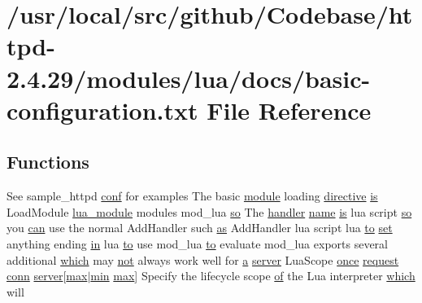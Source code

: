 \hypertarget{basic-configuration_8txt}{}\section{/usr/local/src/github/\+Codebase/httpd-\/2.4.29/modules/lua/docs/basic-\/configuration.txt File Reference}
\label{basic-configuration_8txt}
\subsection*{Functions}
\begin{DoxyCompactItemize}
\item 
See sample\+\_\+httpd \hyperlink{group__MOD__PROXY_ga4d7edd451c4bb8ed9ce9012e5dea2b14}{conf} for examples The basic \hyperlink{group__APACHE__CORE__CONFIG_ga0ea4f633a5f9f88e1603aaeb1f2b2e69}{module} loading \hyperlink{basic-configuration_8txt_afff511b23780162b3e88a118ec5cb4c9}{directive} \hyperlink{NON-AUTOTOOLS-BUILD_8txt_a2569119f3fd3f0d7d7ecea3c96acb0bf}{is} Load\+Module \hyperlink{mod__lua_8h_a572c149d43098558899328ff65c61394}{lua\+\_\+module} modules mod\+\_\+lua \hyperlink{pcretest_8txt_a35e1c9bd1e24f3f31253ab761f792055}{so} The \hyperlink{writing-handlers_8txt_a06375414bd03dc9c48eab0f361ada458}{handler} \hyperlink{pcre_8txt_a5a15d68aadb41c771fe50a27c400d49b}{name} \hyperlink{NON-AUTOTOOLS-BUILD_8txt_a2569119f3fd3f0d7d7ecea3c96acb0bf}{is} lua script \hyperlink{pcretest_8txt_a35e1c9bd1e24f3f31253ab761f792055}{so} you \hyperlink{pcre_8txt_a2a892895a50bc58f3679c7acb58190e6}{can} use the normal Add\+Handler such \hyperlink{pcretest_8txt_a7681723cb91eaa99771ee87f8465c1aa}{as} Add\+Handler lua script lua \hyperlink{pcretest_8txt_aa22c98f630e4b3fe86ee17ce5150c62f}{to} \hyperlink{README_8txt_af5b772536a61c888f9b40122c9816047}{set} anything ending \hyperlink{group__apr__thread__proc_ga2e46fea00cc2238744ebca5061c62bcc}{in} lua \hyperlink{pcretest_8txt_aa22c98f630e4b3fe86ee17ce5150c62f}{to} use mod\+\_\+lua \hyperlink{pcretest_8txt_aa22c98f630e4b3fe86ee17ce5150c62f}{to} evaluate mod\+\_\+lua exports several additional \hyperlink{README_8txt_a9d3df0d4bed2ac7e1c01860363ab4ac2}{which} may \hyperlink{pcre_8txt_aab236af6334f68eebb41dff13921475a}{not} always work well for \hyperlink{pcre_8txt_a841271aab70f5cda9412a19c7753f02c}{a} \hyperlink{group__APR__Util__RC_ga48a1618bc9e57e0406979ef034512520}{server} Lua\+Scope \hyperlink{pcregrep_8txt_aab182d126ab6b06fdffef58b1a664ca1}{once} \hyperlink{ab_8c_ae55c2591fd7f232c48d3f252f18a869a}{request} \hyperlink{group__MOD__PROXY_gaf26a520a5f2c0d567cd7732f04c925c2}{conn} \hyperlink{group__APR__Util__RC_ga48a1618bc9e57e0406979ef034512520}{server}\mbox{[}\hyperlink{group__APR__Util__RC_ga38e7d1fc94ad8c6709d5b2243d2fd94b}{max}$\vert$\hyperlink{group__APR__Util__RL_ga3e202b201e6255d975cd6d3aff1f5a4d}{min} \hyperlink{group__APR__Util__RC_ga38e7d1fc94ad8c6709d5b2243d2fd94b}{max}\mbox{]} Specify the lifecycle scope \hyperlink{pcre_8txt_a9d5b55a535a7d176d14b62d664b47b4d}{of} the Lua interpreter \hyperlink{README_8txt_a9d3df0d4bed2ac7e1c01860363ab4ac2}{which} will 
\end{DoxyCompactItemize}
